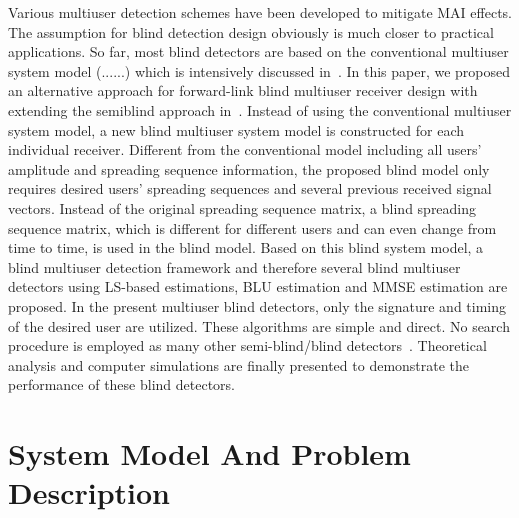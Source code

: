 \documentclass[a4paper,10pt,fleqn, twocolumn]{IEEETran}
\begin{document}
Various multiuser detection schemes have been developed to
mitigate MAI effects. The assumption for blind detection design
obviously is much closer to practical applications. So far, most
blind detectors are based on the conventional multiuser system
model (......) which is intensively discussed in~\cite{Verd98}. In
this paper, we proposed an alternative approach for forward-link
blind multiuser receiver design with extending the semiblind
approach in~\cite{Wang03d,Wang03e}. Instead of using the
conventional multiuser system model, a new blind multiuser system
model is constructed for each individual receiver. Different from
the conventional model including all users' amplitude and
spreading sequence information, the proposed blind model only
requires desired users' spreading sequences and several previous
received signal vectors. Instead of the original spreading
sequence matrix, a blind spreading sequence matrix, which is
different for different users and can even change from time to
time, is used in the blind model. Based on this blind system
model, a blind multiuser detection framework and therefore several
blind multiuser detectors using LS-based estimations, BLU
estimation and MMSE estimation are proposed. In the present
multiuser blind detectors, only the signature and timing of the
desired user are utilized. These algorithms are simple and direct.
No search procedure is employed as many other semi-blind/blind
detectors~\cite{Torl97,Wang98}. Theoretical analysis and computer
simulations are finally presented to demonstrate the performance
of these blind detectors.

\section{System Model And Problem Description}
\end{document}
